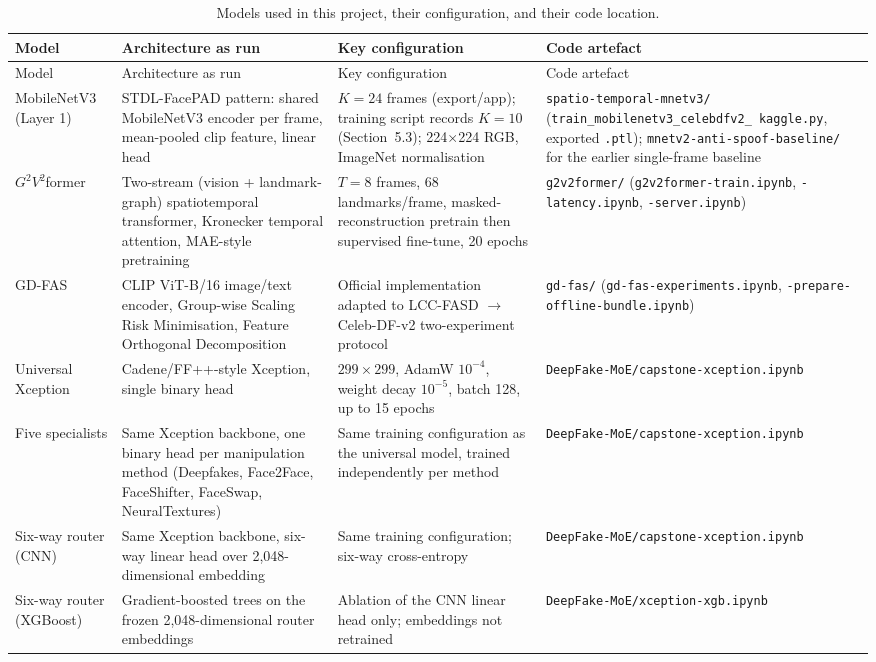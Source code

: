 {\small
\begin{longtable}{@{}p{24mm}p{36mm}p{28mm}p{28mm}@{}}
\caption{Models used in this project, their configuration, and their code
location.}\label{tab:models-used}\\
\toprule
Model & Architecture as run & Key configuration & Code artefact \\
\midrule
\endfirsthead
\toprule
Model & Architecture as run & Key configuration & Code artefact \\
\midrule
\endhead
MobileNetV3 (Layer 1) & STDL-FacePAD pattern: shared MobileNetV3 encoder per
frame, mean-pooled clip feature, linear head \cite{khan2025stdl} & $K=24$
frames (export/app); training script records $K=10$ (Section~5.3); 224$\times$224
RGB, ImageNet normalisation & \texttt{spatio-temporal-mnetv3/}
(\texttt{train\_\allowbreak mobilenetv3\_\allowbreak celebdfv2\_\allowbreak
kaggle.py}, exported \texttt{.ptl}); \texttt{mnetv2-anti-spoof-baseline/} for
the earlier single-frame baseline \\
$G^2V^2$former & Two-stream (vision + landmark-graph) spatiotemporal
transformer, Kronecker temporal attention, MAE-style pretraining
\cite{yang2024g2v2} & $T=8$ frames, 68 landmarks/frame, masked-reconstruction
pretrain then supervised fine-tune, 20 epochs & \texttt{g2v2former/}
(\texttt{g2v2former-train.ipynb}, \texttt{-latency.ipynb},
\texttt{-server.ipynb}) \\
GD-FAS & CLIP ViT-B/16 image/text encoder, Group-wise Scaling Risk
Minimisation, Feature Orthogonal Decomposition \cite{jung2025gdfas} & Official
implementation adapted to LCC-FASD $\to$ Celeb-DF-v2 two-experiment protocol &
\texttt{gd-fas/} (\texttt{gd-fas-experiments.ipynb},
\texttt{-prepare-offline-bundle.ipynb}) \\
Universal Xception & Cadene/FF++-style Xception, single binary head &
$299\times299$, AdamW $10^{-4}$, weight decay $10^{-5}$, batch 128, up to 15
epochs & \texttt{DeepFake-MoE/capstone-xception.ipynb} \\
Five specialists & Same Xception backbone, one binary head per manipulation
method (Deepfakes, Face2Face, FaceShifter, FaceSwap, NeuralTextures) & Same
training configuration as the universal model, trained independently per
method & \texttt{DeepFake-MoE/capstone-xception.ipynb} \\
Six-way router (CNN) & Same Xception backbone, six-way linear head over
2,048-dimensional embedding & Same training configuration; six-way
cross-entropy & \texttt{DeepFake-MoE/capstone-xception.ipynb} \\
Six-way router (XGBoost) & Gradient-boosted trees on the frozen 2,048-dimensional
router embeddings & Ablation of the CNN linear head only; embeddings not
retrained & \texttt{DeepFake-MoE/xception-xgb.ipynb} \\
\bottomrule
\end{longtable}
}

